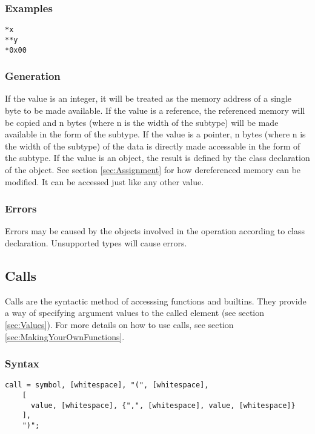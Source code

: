 \documentclass[10pt,a4paper]{article}
\begin{document}
\subsubsection{Examples}
\begin{verbatim}
*x
**y
*0x00
\end{verbatim}

\subsubsection{Generation}
If the value is an integer, it will be treated as the memory address of a single byte to be made available. If the value is a reference, the referenced memory will be copied and n bytes (where n is the width of the subtype) will be made available in the form of the subtype. If the value is a pointer, n bytes (where n is the width of the subtype) of the data is directly made accessable in the form of the subtype. If the value is an object, the result is defined by the class declaration of the object. See section \ref{sec:Assignment} for how dereferenced memory can be modified. It can be accessed just like any other value.

\subsubsection{Errors}
Errors may be caused by the objects involved in the operation according to class declaration. Unsupported types will cause errors.

\newpage




\subsection{Calls}
Calls are the syntactic method of accesssing functions and builtins. They provide a way of specifying argument values to the called element (see section \ref{sec:Values}). For more details on how to use calls, see section \ref{sec:MakingYourOwnFunctions}.

\subsubsection{Syntax}
\begin{verbatim}
call = symbol, [whitespace], "(", [whitespace],
    [
      value, [whitespace], {",", [whitespace], value, [whitespace]}
    ],
    ")";
\end{verbatim}
\end{document}
